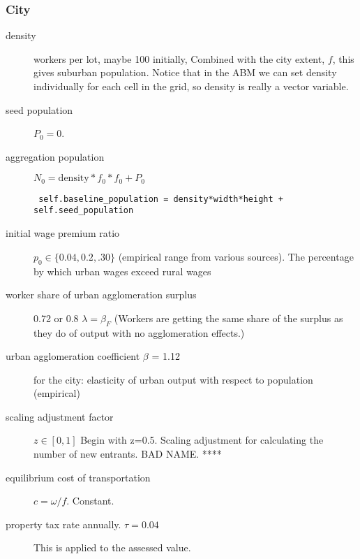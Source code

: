 \subsubsection{City}
\begin{description}
\item [density] workers per lot, maybe 100 initially, Combined with the city extent, $f$, this gives suburban population. %
Notice that in the ABM we can set density individually for each cell in the grid, so density is really a vector variable.  %
\item [seed population] $P_0=0$. %
\item [aggregation  population]  $N_0=\mathrm{density} * f_0 * f_0 + P_0$ 
\begin{lstlisting}
 self.baseline_population = density*width*height + self.seed_population
\end{lstlisting}





\item [initial wage premium ratio] $p_0\in\{0.04,0.2,.30\}$ (empirical range from various sources). The percentage by which urban wages exceed rural wages 

\item [worker share of urban agglomeration surplus] 0.72 or 0.8 $\lambda=\beta_F$ (Workers are getting the same share of the surplus as they do of output with no agglomeration effects.) 
\item [urban agglomeration coefficient $\beta$ = 1.12] for the city: elasticity of urban output with respect to population (empirical)

\item [scaling adjustment factor] $z\in[0,1]$ Begin with z=0.5. Scaling adjustment for calculating the number of new entrants. BAD NAME. ****

\item [equilibrium cost of transportation] $c = \omega/f$. Constant.
\item [property tax rate annually. $\tau=0.04$] This is applied to the assessed value.


\end{description}
